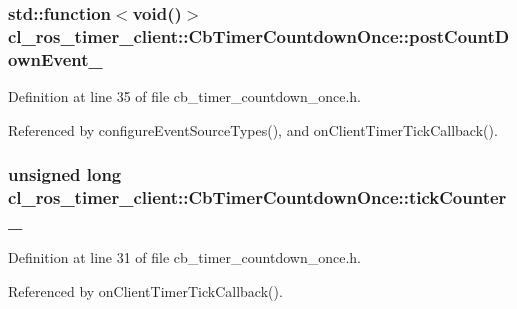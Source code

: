 \subsubsection[{\texorpdfstring{post\+Count\+Down\+Event\+\_\+}{postCountDownEvent_}}]{\setlength{\rightskip}{0pt plus 5cm}std\+::function$<$void()$>$ cl\+\_\+ros\+\_\+timer\+\_\+client\+::\+Cb\+Timer\+Countdown\+Once\+::post\+Count\+Down\+Event\+\_\+\hspace{0.3cm}{\ttfamily [private]}}\hypertarget{classcl__ros__timer__client_1_1CbTimerCountdownOnce_a648944f9f7e6f412647b1358810e4773}{}\label{classcl__ros__timer__client_1_1CbTimerCountdownOnce_a648944f9f7e6f412647b1358810e4773}


Definition at line 35 of file cb\+\_\+timer\+\_\+countdown\+\_\+once.\+h.



Referenced by configure\+Event\+Source\+Types(), and on\+Client\+Timer\+Tick\+Callback().

\subsubsection[{\texorpdfstring{tick\+Counter\+\_\+}{tickCounter_}}]{\setlength{\rightskip}{0pt plus 5cm}unsigned long cl\+\_\+ros\+\_\+timer\+\_\+client\+::\+Cb\+Timer\+Countdown\+Once\+::tick\+Counter\+\_\+\hspace{0.3cm}{\ttfamily [private]}}\hypertarget{classcl__ros__timer__client_1_1CbTimerCountdownOnce_a6ff770e24bb393893433e5b09ce5cfd8}{}\label{classcl__ros__timer__client_1_1CbTimerCountdownOnce_a6ff770e24bb393893433e5b09ce5cfd8}


Definition at line 31 of file cb\+\_\+timer\+\_\+countdown\+\_\+once.\+h.



Referenced by on\+Client\+Timer\+Tick\+Callback().

